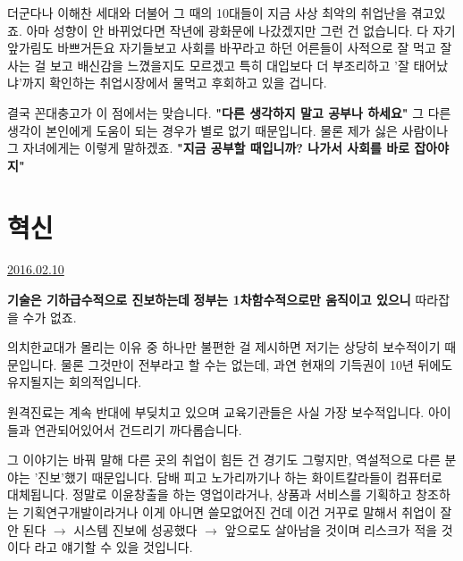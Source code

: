 더군다나 이해찬 세대와 더불어 그 때의 10대들이 지금 사상 최악의 취업난을 겪고있죠.
아마 성향이 안 바뀌었다면 작년에 광화문에 나갔겠지만 그런 건 없습니다. 다 자기 앞가림도 바쁘거든요
자기들보고 사회를 바꾸라고 하던 어른들이 사적으로 잘 먹고 잘 사는 걸 보고 배신감을 느꼈을지도 모르겠고
특히 대입보다 더 부조리하고 '잘 태어났냐'까지 확인하는 취업시장에서 물먹고 후회하고 있을 겁니다.
\vspace{5mm}

결국 꼰대충고가 이 점에서는 맞습니다. \textbf{"다른 생각하지 말고 공부나 하세요"}
그 다른 생각이 본인에게 도움이 되는 경우가 별로 없기 때문입니다.
물론 제가 싫은 사람이나 그 자녀에게는 이렇게 말하겠죠. \textbf{"지금 공부할 때입니까? 나가서 사회를 바로 잡아야지"}
\vspace{5mm}






\section{혁신}
\href{https://www.kockoc.com/Apoc/630187}{2016.02.10}

\vspace{5mm}

\textbf{기술은 기하급수적으로 진보하는데}
\textbf{정부는  1차함수적으로만 움직이고 있으니} 따라잡을 수가 없죠.
\vspace{5mm}

의치한교대가 몰리는 이유 중 하나만 불편한 걸 제시하면 저기는 상당히 보수적이기 때문입니다.
물론 그것만이 전부라고 할 수는 없는데, 과연 현재의 기득권이 10년 뒤에도 유지될지는 회의적입니다.
\vspace{5mm}

원격진료는 계속 반대에 부딪치고 있으며
교육기관들은 사실 가장 보수적입니다. 아이들과 연관되어있어서 건드리기 까다롭습니다.
\vspace{5mm}

그 이야기는 바꿔 말해 다른 곳의 취업이 힘든 건 경기도 그렇지만, 역설적으로 다른 분야는 '진보'했기 때문입니다.
담배 피고 노가리까기나 하는 화이트칼라들이 컴퓨터로 대체됩니다.
정말로 이윤창출을 하는 영업이라거나, 상품과 서비스를 기획하고 창조하는 기획연구개발이라거나 이게 아니면 쓸모없어진 건데
이건 거꾸로 말해서 취업이 잘 안 된다 $\rightarrow$ 시스템 진보에 성공했다 $\rightarrow$ 앞으로도 살아남을 것이며 리스크가 적을 것이다
라고 얘기할 수 있을 것입니다.
\vspace{5mm}

